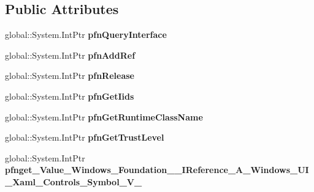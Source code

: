 \subsection*{Public Attributes}
\begin{DoxyCompactItemize}
\item 
\mbox{\label{struct_system_1_1_nullable___a___windows___u_i___xaml___controls___symbol___v_______impl_1_1_vtbl_a0a6e454b4f14b9059665b9b10ad2f7ab}} 
global\+::\+System.\+Int\+Ptr {\bfseries pfn\+Query\+Interface}
\item 
\mbox{\label{struct_system_1_1_nullable___a___windows___u_i___xaml___controls___symbol___v_______impl_1_1_vtbl_ae8fbab57acf7efd3541070ea5e85204d}} 
global\+::\+System.\+Int\+Ptr {\bfseries pfn\+Add\+Ref}
\item 
\mbox{\label{struct_system_1_1_nullable___a___windows___u_i___xaml___controls___symbol___v_______impl_1_1_vtbl_a615e34075ab9df634d2cffbffb4e94fd}} 
global\+::\+System.\+Int\+Ptr {\bfseries pfn\+Release}
\item 
\mbox{\label{struct_system_1_1_nullable___a___windows___u_i___xaml___controls___symbol___v_______impl_1_1_vtbl_a2bb8fc920087547afe28f88591f0f85a}} 
global\+::\+System.\+Int\+Ptr {\bfseries pfn\+Get\+Iids}
\item 
\mbox{\label{struct_system_1_1_nullable___a___windows___u_i___xaml___controls___symbol___v_______impl_1_1_vtbl_ae9a5dec3d4d0e3e855095f1f065446f6}} 
global\+::\+System.\+Int\+Ptr {\bfseries pfn\+Get\+Runtime\+Class\+Name}
\item 
\mbox{\label{struct_system_1_1_nullable___a___windows___u_i___xaml___controls___symbol___v_______impl_1_1_vtbl_a9d3d61d4507719e99b6ff5eb99840d25}} 
global\+::\+System.\+Int\+Ptr {\bfseries pfn\+Get\+Trust\+Level}
\item 
\mbox{\label{struct_system_1_1_nullable___a___windows___u_i___xaml___controls___symbol___v_______impl_1_1_vtbl_a5ffc56cbb517df5d8a6e24039fa04696}} 
global\+::\+System.\+Int\+Ptr {\bfseries pfnget\+\_\+\+Value\+\_\+\+Windows\+\_\+\+Foundation\+\_\+\+\_\+\+I\+Reference\+\_\+\+A\+\_\+\+Windows\+\_\+\+U\+I\+\_\+\+Xaml\+\_\+\+Controls\+\_\+\+Symbol\+\_\+\+V\+\_\+}
\end{DoxyCompactItemize}
